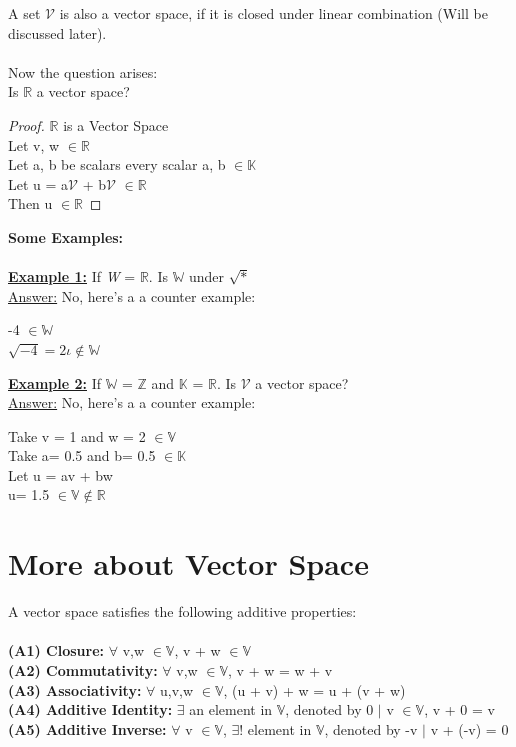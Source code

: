 \documentclass[12pt]{article}
\theoremstyle{definition}
\newcommand\tab[1][1.25cm]{\hspace*{#1}}
\def \R{\mathbb{R}}
\begin{document}
A set $\mathscr{V}$ is also a vector space, if it is closed under linear combination (Will be discussed later).\\\\


Now the question arises:\\
Is $\R$ a vector space?\\
\begin{proof}
	$\R$ is a Vector Space\\
	\tab Let v, w $\in \R$\\
	\tab Let a, b  be scalars \tab every scalar a, b $\in \mathbb{K}$ \\
	\tab Let u = a$\mathscr{V}$ + b$\mathscr{V}$ $\in \R$\\
	\tab Then u $\in \R$	 
\end{proof}
\textbf{Some Examples:}\\\\
\textbf{\underline{Example 1:}} If \textit{W} = $\R$. Is $\mathbb{W}$ under $\sqrt{*}$\\
\tab \underline{Answer:} No, here's a a counter example:\begin{center}
-4 $\in \mathbb{W}$\\
$\sqrt{-4} = 2\iota \notin \mathbb{W}$
\end{center} 

\textbf{\underline{Example 2:}} If $\mathbb{W}$ = $\mathbb{Z}$ and $\mathbb{K}$ = $\R$. Is $\mathscr{V}$ a vector space?\\
\tab \underline{Answer:} No, here's a a counter example:\begin{center}
Take v = 1 and w = 2 $\in \mathbb{V}$\\
Take a= 0.5 and b= 0.5 $\in \mathbb{K}$\\
Let u = av + bw\\
u= 1.5 $\in \mathbb{V} \notin \R$
\end{center} 

\section{More about Vector Space}
A vector space satisfies the following additive properties:\\\\
\textbf{(A1) Closure: }$\forall$ v,w $\in \mathbb{V}$,  v + w $\in \mathbb{V}$\\
\textbf{(A2) Commutativity: }$\forall$ v,w $\in \mathbb{V}$,  v + w = w + v\\
\textbf{(A3) Associativity: }$\forall$ u,v,w $\in \mathbb{V}$, (u + v) + w = u + (v + w)\\
\textbf{(A4) Additive Identity: }$\exists$ an element in $\mathbb{V}$, denoted by 0 $\mid$ v $\in \mathbb{V}$, v + 0 = v\\
\textbf{(A5) Additive Inverse: }$\forall$ v $\in \mathbb{V}$, $\exists!$ element in $\mathbb{V}$, denoted by -v $\mid$ v + (-v) = 0\\
\end{document}
